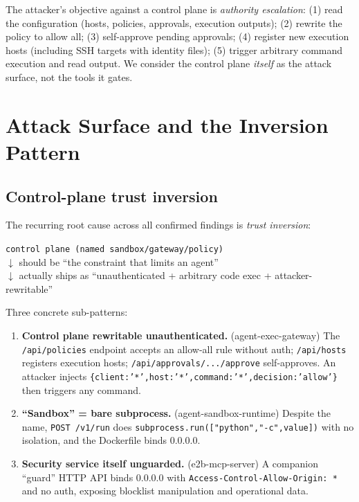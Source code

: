 \documentclass{llncs}
\begin{document}
The attacker's objective against a control plane is \emph{authority escalation}: (1) read the configuration (hosts, policies, approvals, execution outputs); (2) rewrite the policy to allow all; (3) self-approve pending approvals; (4) register new execution hosts (including SSH targets with identity files); (5) trigger arbitrary command execution and read output. We consider the control plane \emph{itself} as the attack surface, not the tools it gates.

\section{Attack Surface and the Inversion Pattern}\label{sec:surface}

\subsection{Control-plane trust inversion}\label{sub:inversion}
The recurring root cause across all confirmed findings is \emph{trust inversion}:

\begin{center}
\small
\texttt{control plane (named sandbox/gateway/policy)}
\\
$\downarrow$ should be ``the constraint that limits an agent''
\\
$\downarrow$ actually ships as ``unauthenticated + arbitrary code exec + attacker-rewritable''
\end{center}

Three concrete sub-patterns:
\begin{enumerate}
    \item \textbf{Control plane rewritable unauthenticated.} (agent-exec-gateway) The \texttt{/api/policies} endpoint accepts an allow-all rule without auth; \texttt{/api/hosts} registers execution hosts; \texttt{/api/approvals/.../approve} self-approves. An attacker injects \texttt{\{client:'*',host:'*',command:'*',decision:'allow'\}} then triggers any command.
    \item \textbf{``Sandbox'' = bare subprocess.} (agent-sandbox-runtime) Despite the name, \texttt{POST /v1/run} does \texttt{subprocess.run(["python","-c",value])} with no isolation, and the Dockerfile binds 0.0.0.0.
    \item \textbf{Security service itself unguarded.} (e2b-mcp-server) A companion ``guard'' HTTP API binds 0.0.0.0 with \texttt{Access-Control-Allow-Origin: *} and no auth, exposing blocklist manipulation and operational data.
\end{enumerate}
\end{document}
